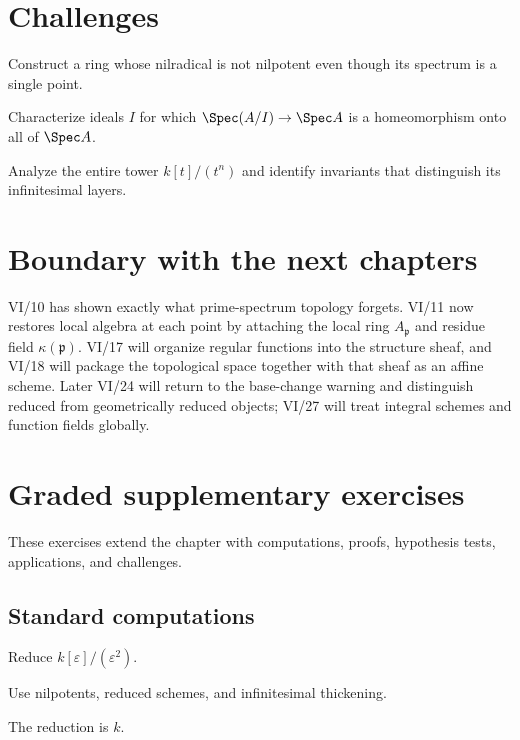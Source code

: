 \section{Challenges}
\ifdefined\FullProblemDossiers

\else
\begin{problem}
Construct a ring whose nilradical is not nilpotent even though its spectrum is a single point.
\end{problem}
\begin{problem}
Characterize ideals $I$ for which $\Spec(A/I)\to\Spec A$ is a homeomorphism onto all of
$\Spec A$.
\end{problem}
\begin{problem}
Analyze the entire tower $k[t]/(t^n)$ and identify invariants that distinguish its infinitesimal layers.
\end{problem}
\fi

\section{Boundary with the next chapters}

VI/10 has shown exactly what prime-spectrum topology forgets.  VI/11 now restores local
algebra at each point by attaching the local ring $A_{\mathfrak p}$ and residue field
$\kappa(\mathfrak p)$.  VI/17 will organize regular functions into the structure sheaf,
and VI/18 will package the topological space together with that sheaf as an affine scheme.
Later VI/24 will return to the base-change warning and distinguish reduced from geometrically
reduced objects; VI/27 will treat integral schemes and function fields globally.
\section{Graded supplementary exercises}
These exercises extend the chapter with computations, proofs, hypothesis tests, applications, and challenges.

\subsection*{Standard computations}

\begin{exercise}\label{exr:vi10-expand-01}
Reduce $k[\varepsilon]/(\varepsilon^2)$.
\end{exercise}
\begin{hint}
Use nilpotents, reduced schemes, and infinitesimal thickening.
\end{hint}
\begin{solution}
The reduction is $k$.
\end{solution}

